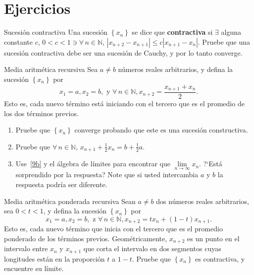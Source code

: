 \section*{Ejercicios}
\begin{prob}{Sucesión contractiva}
	Una sucesión $\left\{x_{n}\right\}$ se dice que \textbf{contractiva} si $\exists$ alguna constante $c$, $0<c<1\ni\forall\,n\in\mathds{N}$, $|x_{n+2}-x_{n+1}|\leq c|x_{n+1}-x_{n}|$. Pruebe que una sucesión contractiva debe ser una sucesión de Cauchy, y por lo tanto converge.
\end{prob}

\begin{solution}
	
\end{solution}

\begin{prob}{Media aritmética recursiva}
Sea $a\neq b$ números reales arbitrarios, y defina la sucesión $\left\{x_{n}\right\}$ por \[ x_{1}=a,x_{2}=b,\text{ y }\forall\,n\in\mathds{N},x_{n+2}=\frac{x_{n+1}+x_{n}}{2}. \] Esto es, cada nuevo término está iniciando con el tercero que es el promedio de los dos términos previos.
	\begin{enumerate}
		\item Pruebe que $\left\{x_{n}\right\}$ converge probando que este es una sucesión constructiva.
		\item Pruebe que $\forall\,n\in\mathds{N}$, $x_{n+1}+\frac{1}{2}x_{n}=b+\frac{1}{2}a$.\label{9b}
		\item Use~\ref{9b} y el álgebra de límites para encontrar que  $\lim\limits_{n\to\infty}x_{n}$. ?`Está sorprendido por la respuesta? Note que si usted intercambia $a$ y $b$ la respuesta podría ser diferente.
	\end{enumerate}
\end{prob}

\begin{solution}
	
\end{solution}

\begin{prob}{Media aritmética ponderada recursiva}
	Sean $a\neq b$ dos números reales arbitrarios, sea $0<t<1$, y defina la sucesión $\left\{x_{n}\right\}$ por \[ x_{1}=a,x_{2}=b,\text{ z }\forall\,n\in\mathds{N},x_{n+2}=tx_{n}+\left(1-t\right)x_{n+1}. \] Esto es, cada nuevo término que inicia con el tercero que es el promedio ponderado de los términos previos. Geométricamente, $x_{n+2}$ es un punto en el intervalo entre $x_{n}$ y $x_{n+1}$ que corta el intervalo en dos segmentos cuyas longitudes están en la proporción $t$ a $1-t$. Pruebe que $\left\{x_{n}\right\}$ es contractiva, y encuentre su límite.
\end{prob}

